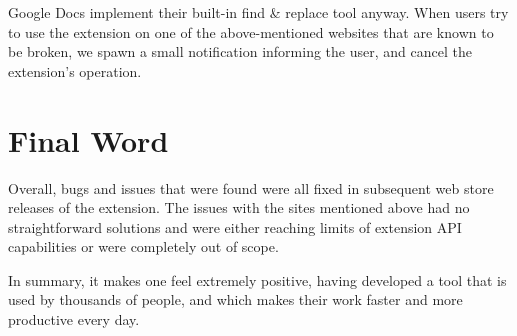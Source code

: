 \documentclass[bsc,frontabs,twoside,singlespacing,parskip,deptreport]{infthesis}
\begin{document}
Google Docs implement their built-in find \& replace tool anyway. When users try to use the extension on one of the above-mentioned websites that are known to be broken, we spawn a small notification informing the user, and cancel the extension's operation.

\section{Final Word}
Overall, bugs and issues that were found were all fixed in subsequent web store releases of the extension. The issues with the sites mentioned above had no straightforward solutions and were either reaching limits of extension API capabilities or were completely out of scope.

In summary, it makes one feel extremely positive, having developed a tool that is used by thousands of people, and which makes their work faster and more productive every day.



\end{document}
